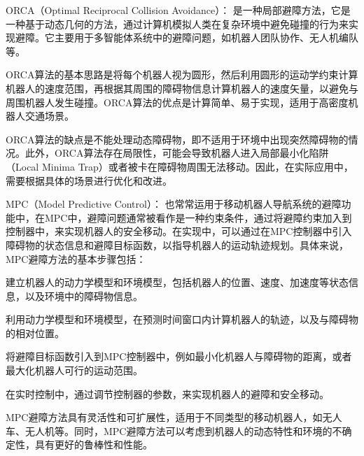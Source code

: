 ORCA（Optimal Reciprocal Collision Avoidance）：
是一种局部避障方法，它是一种基于动态几何的方法，通过计算机模拟人类在复杂环境中避免碰撞的行为来实现避障。它主要用于多智能体系统中的避障问题，如机器人团队协作、无人机编队等。

ORCA算法的基本思路是将每个机器人视为圆形，然后利用圆形的运动学约束计算机器人的速度范围，再根据其周围的障碍物信息计算机器人的速度矢量，以避免与周围机器人发生碰撞。ORCA算法的优点是计算简单、易于实现，适用于高密度机器人交通场景。

ORCA算法的缺点是不能处理动态障碍物，即不适用于环境中出现突然障碍物的情况。此外，ORCA算法存在局限性，可能会导致机器人进入局部最小化陷阱（Local Minima Trap）或者被卡在障碍物周围无法移动。因此，在实际应用中，需要根据具体的场景进行优化和改进。

MPC（Model Predictive Control）：
也常常运用于移动机器人导航系统的避障功能中，在MPC中，避障问题通常被看作是一种约束条件，通过将避障约束加入到控制器中，来实现机器人的安全移动。在实现中，可以通过在MPC控制器中引入障碍物的状态信息和避障目标函数，以指导机器人的运动轨迹规划。具体来说，MPC避障方法的基本步骤包括：

建立机器人的动力学模型和环境模型，包括机器人的位置、速度、加速度等状态信息，以及环境中的障碍物信息。

利用动力学模型和环境模型，在预测时间窗口内计算机器人的轨迹，以及与障碍物的相对位置。

将避障目标函数引入到MPC控制器中，例如最小化机器人与障碍物的距离，或者最大化机器人可行的运动范围。

在实时控制中，通过调节控制器的参数，来实现机器人的避障和安全移动。

MPC避障方法具有灵活性和可扩展性，适用于不同类型的移动机器人，如无人车、无人机等。同时，MPC避障方法可以考虑到机器人的动态特性和环境的不确定性，具有更好的鲁棒性和性能。
